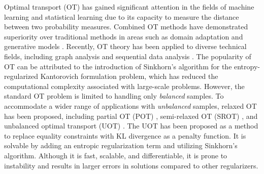 \documentclass[conference]{IEEEtran}
\begin{document}
Optimal transport (OT) has gained significant attention in the fields of machine learning and statistical learning due to its capacity to measure the distance between two probability measures. Combined OT methods have demonstrated superiority over traditional methods in areas such as domain adaptation \cite{Courty_PAMI_2017} and generative models \cite{arjovsky2017wasserstein}. Recently, OT theory has been applied to diverse technical fields, including graph analysis \cite{Huang_SigPro_2020,Huang_ICASSP_2021,Fang_AAAI_2023} and sequential data analysis \cite{Horie_EUSIPCO_2022}. The popularity of OT can be attributed to the introduction of Sinkhorn's algorithm \cite{Cuturi_NIPS_2013} for the entropy-regularized Kantorovich formulation problem, which has reduced the computational complexity associated with large-scale problems. However, the standard OT problem is limited to handling only {\it balanced} samples. To accommodate a wider range of applications with {\it unbalanced} samples, relaxed OT has been proposed, including partial OT (POT) \cite{ferradans2013regularized}, semi-relaxed OT (SROT) \cite{fukunaga_icassp2022,fukunaga_srsinkhorn}, and unbalanced optimal transport (UOT) \cite{Caffarelli_AM_2010,chizat2017scaling}. The UOT has been proposed as a method to replace equality constraints with KL divergence as a penalty function. It is solvable by adding an entropic regularization term and utilizing Sinkhorn's algorithm. Although it is fast, scalable, and differentiable, it is prone to instability and results in larger errors in solutions compared to other regularizers.
\end{document}
